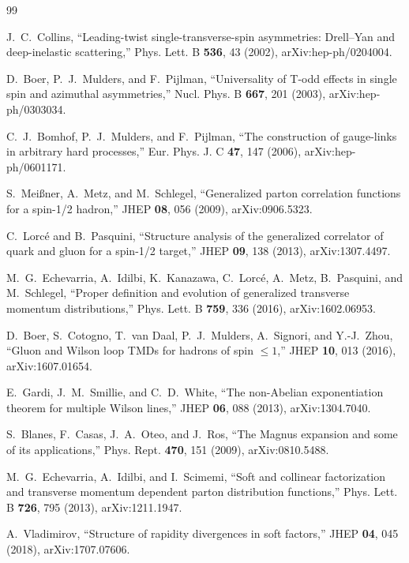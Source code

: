 \documentclass[11pt]{article}
\begin{document}
\small
\begin{thebibliography}{99}
\raggedright

J.~C.~Collins,
``Leading-twist single-transverse-spin asymmetries: Drell--Yan and
deep-inelastic scattering,''
Phys. Lett. B \textbf{536}, 43 (2002),
arXiv:hep-ph/0204004.

D.~Boer, P.~J.~Mulders, and F.~Pijlman,
``Universality of T-odd effects in single spin and azimuthal asymmetries,''
Nucl. Phys. B \textbf{667}, 201 (2003),
arXiv:hep-ph/0303034.

C.~J.~Bomhof, P.~J.~Mulders, and F.~Pijlman,
``The construction of gauge-links in arbitrary hard processes,''
Eur. Phys. J. C \textbf{47}, 147 (2006),
arXiv:hep-ph/0601171.

S.~Mei{\ss}ner, A.~Metz, and M.~Schlegel,
``Generalized parton correlation functions for a spin-1/2 hadron,''
JHEP \textbf{08}, 056 (2009),
arXiv:0906.5323.

C.~Lorc\'e and B.~Pasquini,
``Structure analysis of the generalized correlator of quark and gluon for a
spin-1/2 target,''
JHEP \textbf{09}, 138 (2013),
arXiv:1307.4497.

M.~G.~Echevarria, A.~Idilbi, K.~Kanazawa, C.~Lorc\'e, A.~Metz,
B.~Pasquini, and M.~Schlegel,
``Proper definition and evolution of generalized transverse momentum
distributions,''
Phys. Lett. B \textbf{759}, 336 (2016),
arXiv:1602.06953.

D.~Boer, S.~Cotogno, T.~van Daal, P.~J.~Mulders, A.~Signori, and
Y.-J.~Zhou,
``Gluon and Wilson loop TMDs for hadrons of spin \(\leq1\),''
JHEP \textbf{10}, 013 (2016),
arXiv:1607.01654.

E.~Gardi, J.~M.~Smillie, and C.~D.~White,
``The non-Abelian exponentiation theorem for multiple Wilson lines,''
JHEP \textbf{06}, 088 (2013),
arXiv:1304.7040.

S.~Blanes, F.~Casas, J.~A.~Oteo, and J.~Ros,
``The Magnus expansion and some of its applications,''
Phys. Rept. \textbf{470}, 151 (2009),
arXiv:0810.5488.

M.~G.~Echevarria, A.~Idilbi, and I.~Scimemi,
``Soft and collinear factorization and transverse momentum dependent parton
distribution functions,''
Phys. Lett. B \textbf{726}, 795 (2013),
arXiv:1211.1947.

A.~Vladimirov,
``Structure of rapidity divergences in soft factors,''
JHEP \textbf{04}, 045 (2018),
arXiv:1707.07606.


\end{thebibliography}
\end{document}
